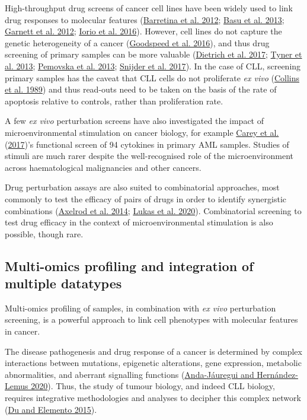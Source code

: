 \documentclass[11pt, a4paper, twosided]{book}
\begin{document}
High-throughput drug screens of cancer cell lines have been widely used to link drug responses to molecular features (\protect\hyperlink{ref-Barretina2012}{Barretina et al. 2012}; \protect\hyperlink{ref-Basu2013}{Basu et al. 2013}; \protect\hyperlink{ref-Garnett2012}{Garnett et al. 2012}; \protect\hyperlink{ref-Iorio2016}{Iorio et al. 2016}). However, cell lines do not capture the genetic heterogeneity of a cancer (\protect\hyperlink{ref-Goodspeed2016}{Goodspeed et al. 2016}), and thus drug screening of primary samples can be more valuable (\protect\hyperlink{ref-JCIpaper}{Dietrich et al. 2017}; \protect\hyperlink{ref-Tyner2013}{Tyner et al. 2013}; \protect\hyperlink{ref-Pemovska2013}{Pemovska et al. 2013}; \protect\hyperlink{ref-Snijder2017}{Snijder et al. 2017}). In the case of CLL, screening primary samples has the caveat that CLL cells do not proliferate \emph{ex vivo} (\protect\hyperlink{ref-Collins1989}{Collins et al. 1989}) and thus read-outs need to be taken on the basis of the rate of apoptosis relative to controls, rather than proliferation rate.

A few \emph{ex vivo} perturbation screens have also investigated the impact of microenvironmental stimulation on cancer biology, for example \protect\hyperlink{ref-Carey2017}{Carey et al.} (\protect\hyperlink{ref-Carey2017}{2017})'s functional screen of 94 cytokines in primary AML samples. Studies of stimuli are much rarer despite the well-recognised role of the microenvironment across haematological malignancies and other cancers.

Drug perturbation assays are also suited to combinatorial approaches, most commonly to test the efficacy of pairs of drugs in order to identify synergistic combinations (\protect\hyperlink{ref-Axelrod2014}{Axelrod et al. 2014}; \protect\hyperlink{ref-Lukas2020}{Lukas et al. 2020}). Combinatorial screening to test drug efficacy in the context of microenvironmental stimulation is also possible, though rare.

\hypertarget{multi-omics-cll-intro}{%
\subsection{Multi-omics profiling and integration of multiple datatypes}\label{multi-omics-cll-intro}}

Multi-omics profiling of samples, in combination with \emph{ex vivo} perturbation screening, is a powerful approach to link cell phenotypes with molecular features in cancer.

The disease pathogenesis and drug response of a cancer is determined by complex interactions between mutations, epigenetic alterations, gene expression, metabolic abnormalities, and aberrant signalling functions (\protect\hyperlink{ref-Anda2020}{Anda-Jáuregui and Hernández-Lemus 2020}). Thus, the study of tumour biology, and indeed CLL biology, requires integrative methodologies and analyses to decipher this complex network (\protect\hyperlink{ref-Du2015}{Du and Elemento 2015}).
\end{document}
